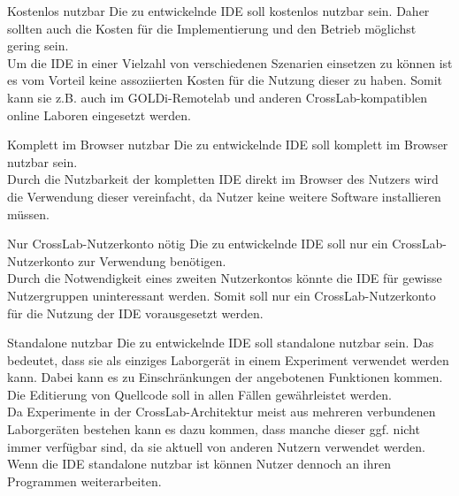 \begin{requirement}{Kostenlos nutzbar}
    \reqdescription Die zu entwickelnde IDE soll kostenlos nutzbar sein. Daher sollten auch die Kosten für die Implementierung und den Betrieb möglichst gering sein. \\
    \reqrationale Um die IDE in einer Vielzahl von verschiedenen Szenarien einsetzen zu können ist es vom Vorteil keine assoziierten Kosten für die Nutzung dieser zu haben. Somit kann sie z.B. auch im GOLDi-Remotelab und anderen CrossLab-kompatiblen online Laboren eingesetzt werden. \\
\end{requirement}

\begin{requirement}{Komplett im Browser nutzbar}
    \reqdescription Die zu entwickelnde IDE soll komplett im Browser nutzbar sein. \\
    \reqrationale Durch die Nutzbarkeit der kompletten IDE direkt im Browser des Nutzers wird die Verwendung dieser vereinfacht, da Nutzer keine weitere Software installieren müssen. \\
\end{requirement}

\begin{requirement}{Nur CrossLab-Nutzerkonto nötig}
    \reqdescription Die zu entwickelnde IDE soll nur ein CrossLab-Nutzerkonto zur Verwendung benötigen. \\
    \reqrationale Durch die Notwendigkeit eines zweiten Nutzerkontos könnte die IDE für gewisse Nutzergruppen uninteressant werden. Somit soll nur ein CrossLab-Nutzerkonto für die Nutzung der IDE vorausgesetzt werden. \\
\end{requirement}

\begin{requirement}{Standalone nutzbar}
    \reqdescription Die zu entwickelnde IDE soll standalone nutzbar sein. Das bedeutet, dass sie als einziges Laborgerät in einem Experiment verwendet werden kann. Dabei kann es zu Einschränkungen der angebotenen Funktionen kommen. Die Editierung von Quellcode soll in allen Fällen gewährleistet werden. \\
    \reqrationale Da Experimente in der CrossLab-Architektur meist aus mehreren verbundenen Laborgeräten bestehen kann es dazu kommen, dass manche dieser ggf. nicht immer verfügbar sind, da sie aktuell von anderen Nutzern verwendet werden. Wenn die IDE standalone nutzbar ist können Nutzer dennoch an ihren Programmen weiterarbeiten. \\
\end{requirement}

